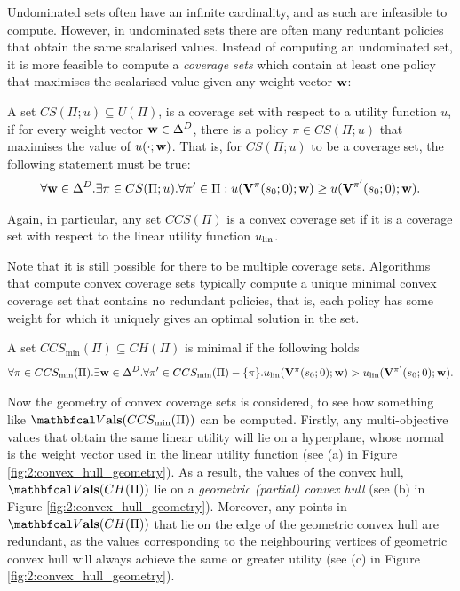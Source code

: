     Undominated sets often have an infinite cardinality, and as such are infeasible to compute. However, in undominated sets there are often many reduntant policies that obtain the same scalarised values. Instead of computing an undominated set, it is more feasible to compute a \textit{coverage sets} which contain at least one policy that maximises the scalarised value given any weight vector $\mathbf{w}$:
    \begin{defn}
        \label{def:2:coverage_set}
        \label{def:2:convex_coverage_set}
        A set $CS(\Pi;u)\subseteq U(\Pi)$, is a \textnormal{coverage set} with respect to a utility function $u$, if for every weight vector $\mathbf{w}\in\Delta^D$, there is a policy $\pi\in CS(\Pi;u)$ that maximises the value of $u(\cdot;\mathbf{w})$. That is, for $CS(\Pi;u)$ to be a coverage set, the following statement must be true:
        \begin{align}
            \forall \mathbf{w}\in\Delta^D. \exists \pi\in CS(\Pi;u). \forall \pi'\in\Pi: u(\mathbf{V}^{\pi}(s_0;0);\mathbf{w}) \geq u(\mathbf{V}^{\pi'}(s_0;0);\mathbf{w}). \label{cond:coverage_set}
        \end{align}

        Again, in particular, any set $CCS(\Pi)$ is a \textnormal{convex coverage set} if it is a coverage set with respect to the linear utility function $u_{{\textnormal{lin}}}$. 
    \end{defn}

    Note that it is still possible for there to be multiple coverage sets. Algorithms that compute convex coverage sets typically compute a unique minimal convex coverage set that contains no redundant policies, that is, each policy has some weight for which it uniquely gives an optimal solution in the set.
    \begin{defn}
        \label{def:2:min_convex_coverage_set}
        A set $CCS_{\min}(\Pi)\subseteq CH(\Pi)$ is minimal if the following holds
        \begin{align}
         \forall \pi\in CCS_{\min}(\Pi). \exists \mathbf{w}\in\Delta^D. \forall \pi'\in CCS_{\min}(\Pi)-\{\pi\}. u_{{\textnormal{lin}}}(\mathbf{V}^{\pi}(s_0;0);\mathbf{w}) > u_{{\textnormal{lin}}}(\mathbf{V}^{\pi'}(s_0;0);\mathbf{w}).
        \end{align}
    \end{defn} 

    Now the geometry of convex coverage sets is considered, to see how something like $\valset(CCS_{\min}(\Pi))$ can be computed. Firstly, any multi-objective values that obtain the same linear utility will lie on a hyperplane, whose normal is the weight vector used in the linear utility function (see (a) in Figure \ref{fig:2:convex_hull_geometry}). As a result, the values of the convex hull, $\valset(CH(\Pi))$ lie on a \textit{geometric (partial) convex hull} (see (b) in Figure \ref{fig:2:convex_hull_geometry}). Moreover, any points in $\valset(CH(\Pi))$ that lie on the edge of the geometric convex hull are redundant, as the values corresponding to the neighbouring vertices of geometric convex hull will always achieve the same or greater utility (see (c) in Figure \ref{fig:2:convex_hull_geometry}).

